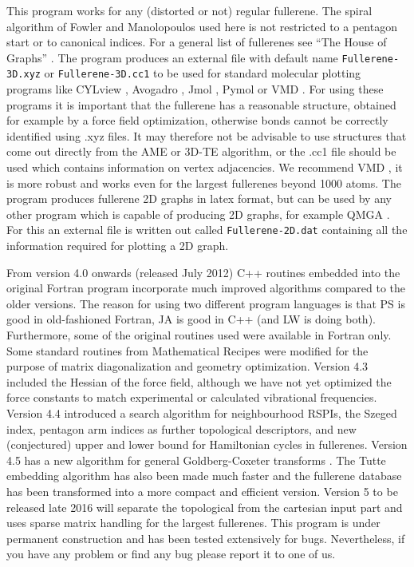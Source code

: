\documentclass[article,a4paper,twoside]{memoir}
\newcommand{\filename}[1]{\texttt{#1}}
\begin{document}
This program works for any (distorted or not) regular fullerene. The spiral algorithm of Fowler and Manolopoulos used here \cite{Atlas}
is not restricted to a pentagon start or to canonical indices. For a general list of fullerenes see ``The House of Graphs'' \cite{HouseofGraphs}. 
The program produces an external file with default name \filename{Fullerene-3D.xyz} or \filename{Fullerene-3D.cc1}
to be used for standard molecular plotting programs
like CYLview \cite{CYLview}, Avogadro \cite{Avogadro}, Jmol \cite{JMol}, Pymol \cite{Pymol} or VMD \cite{vmd}.  For using these programs 
it is important that the fullerene has a reasonable structure, obtained for example by a force field 
optimization, otherwise bonds cannot be correctly identified using .xyz files. It may therefore not
be advisable to use structures that come out directly from
the AME or 3D-TE algorithm, or the .cc1 file should be used which contains information on vertex adjacencies. 
We recommend VMD \cite{vmd}, it is more robust and works even for the largest fullerenes beyond 1000 atoms. The program produces fullerene 2D graphs 
in latex format, but can be used by any other program which is capable of producing 2D graphs, for example QMGA \cite{Gabriel2008}. 
For this an external file is written out called \filename{Fullerene-2D.dat} containing all the information required for plotting a 2D graph.

From version 4.0 onwards (released July 2012) C++ routines embedded into the original Fortran program incorporate
much improved algorithms compared to the older versions. The reason for using two different program languages is
that PS is good in old-fashioned Fortran, JA is good in C++ (and LW is doing both).  Furthermore, some of the original routines used were available 
in Fortran only. Some standard routines from Mathematical Recipes were modified for the purpose of matrix diagonalization 
and geometry optimization. Version 4.3 included the Hessian of the force field, although 
we have not yet optimized the force constants to match experimental or calculated vibrational frequencies.
Version 4.4 introduced a search algorithm for neighbourhood RSPIs, the Szeged index, pentagon arm indices as further topological descriptors,
and new (conjectured) upper and lower bound for Hamiltonian cycles in fullerenes.
Version 4.5 has a new algorithm for general Goldberg-Coxeter transforms \cite{Avery}.
The Tutte embedding algorithm has also been made much faster and the fullerene database has been transformed into a more compact and efficient version.
Version 5 to be released late 2016 will separate the topological from the cartesian input part and uses sparse matrix handling for the
largest fullerenes. This program is under permanent construction and has been tested extensively for bugs.
Nevertheless, if you have any problem or find any bug please report it to one of us.
\end{document}
